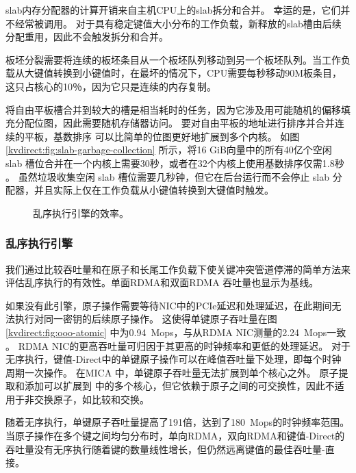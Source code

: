 slab内存分配器的计算开销来自主机CPU上的slab拆分和合并。
幸运的是，它们并不经常被调用。
对于具有稳定键值大小分布的工作负载，新释放的slab槽由后续分配重用，因此不会触发拆分和合并。

板坯分裂需要将连续的板坯条目从一个板坯队列移动到另一个板坯队列。当工作负载从大键值转换到小键值时，在最坏的情况下，CPU需要每秒移动90M板条目，这只占核心的10％，因为它只是连续的内存复制。

将自由平板槽合并到较大的槽是相当耗时的任务，因为它涉及用可能随机的偏移填充分配位图，因此需要随机存储器访问。
要对自由平板的地址进行排序并合并连续的平板，基数排序 \cite {satish2010fast} 可以比简单的位图更好地扩展到多个内核。
如图\ref {kvdirect:fig:slab-garbage-collection} 所示，将16 GiB向量中的所有40亿个空闲 slab 槽位合并在一个内核上需要30秒，或者在32个内核上使用基数排序仅需1.8秒 \cite{satish2010fast}。
虽然垃圾收集空闲 slab 槽位需要几秒钟，但它在后台运行而不会停止 slab 分配器，并且实际上仅在工作负载从小键值转换到大键值时触发。

\begin{figure}[t]
\centering
{}
\caption{乱序执行引擎的效率。}
\label{kvdirect:fig:ooo-eval}

\end{figure}


\subsubsection{乱序执行引擎}
\label{kvdirect:sec:ooo-eval}

我们通过比较吞吐量和在原子和长尾工作负载下使关键冲突管道停滞的简单方法来评估乱序执行的有效性。单面RDMA和双面RDMA \cite {kalia2016design}吞吐量也显示为基线。

如果没有此引擎，原子操作需要等待NIC中的PCIe延迟和处理延迟，在此期间无法执行对同一密钥的后续原子操作。
这使得单键原子吞吐量在图 \ref{kvdirect:fig:ooo-atomic} 中为0.94~Mops，与从RDMA NIC测量的2.24~Mops一致 \cite {kalia2016design}。
RDMA NIC的更高吞吐量可归因于其更高的时钟频率和更低的处理延迟。
对于无序执行，键值-Direct中的单键原子操作可以在峰值吞吐量下处理，即每个时钟周期一次操作。
在MICA \cite {lim2014mica} 中，单键原子吞吐量无法扩展到单个核心之外。
原子提取和添加可以扩展到 \cite {kalia2016design} 中的多个核心，但它依赖于原子之间的可交换性，因此不适用于非交换原子，如比较和交换。

随着无序执行，单键原子吞吐量提高了191倍，达到了180~Mops的时钟频率范围。
当原子操作在多个键之间均匀分布时，单向RDMA，双向RDMA和键值-Direct的吞吐量没有无序执行随着键的数量线性增长，但仍然远离键值的最佳吞吐量-直接。

